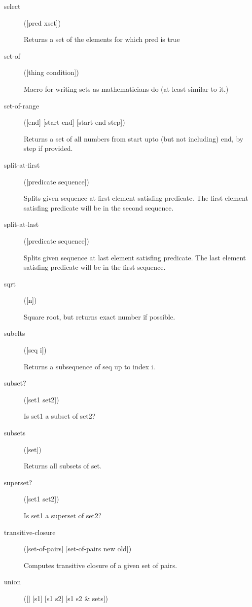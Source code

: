 \begin{description}
  \item[select]
([pred xset])

Returns a set of the elements for which pred is true

  \item[set-of]
([thing condition])

Macro for writing sets as mathematicians do (at least similar to it.)

  \item[set-of-range]
([end] [start end] [start end step])

Returns a set of all numbers from start upto (but not including) end,
  by step if provided.

  \item[split-at-first]
([predicate sequence])

Splits given sequence at first element satisfing predicate.
  The first element satisfing predicate will be in the second sequence.

  \item[split-at-last]
([predicate sequence])

Splits given sequence at last element satisfing predicate.
  The last element satisfing predicate will be in the first sequence.

  \item[sqrt]
([n])

Square root, but returns exact number if possible.

  \item[subelts]
([seq i])

Returns a subsequence of seq up to index i.

  \item[subset?]
([set1 set2])

Is set1 a subset of set2?

  \item[subsets]
([set])

Returns all subsets of set.

  \item[superset?]
([set1 set2])

Is set1 a superset of set2?

  \item[transitive-closure]
([set-of-pairs] [set-of-pairs new old])

Computes transitive closure of a given set of pairs.

  \item[union]
([] [s1] [s1 s2] [s1 s2 \& sets])


\end{description}
